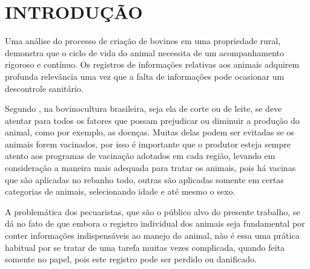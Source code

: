 %
%


\chapter{\textbf{INTRODUÇÃO}}\label{chap:introducao}

Uma análise do processo de criação de bovinos em uma propriedade rural, demonstra que o ciclo de vida do animal necessita de um acompanhamento rigoroso e contínuo. Os registros de informações relativas aos animais adquirem profunda relevância uma vez que a falta de informações pode ocasionar um descontrole sanitário.

Segundo , na bovinocultura brasileira, seja ela de corte ou de leite, se deve atentar para todos os fatores que possam prejudicar ou diminuir a produção do animal, como por exemplo, as doenças. Muitas  delas podem ser evitadas se os animais forem vacinados, por isso é importante que o produtor esteja sempre atento aos programas de vacinação adotados em cada região, levando em consideração a maneira mais adequada para tratar os animais, pois há vacinas que são aplicadas no rebanho todo, outras são aplicadas somente em certas categorias de animais, selecionando idade e até mesmo o sexo.

A problemática dos pecuaristas, que são o público alvo do presente trabalho, se dá no fato de que embora o registro individual dos animais seja fundamental por conter informações indispensáveis ao manejo do animal, não é essa uma prática habitual por se tratar de uma tarefa muitas vezes complicada, quando feita somente no papel, pois este registro pode ser perdido ou danificado.

